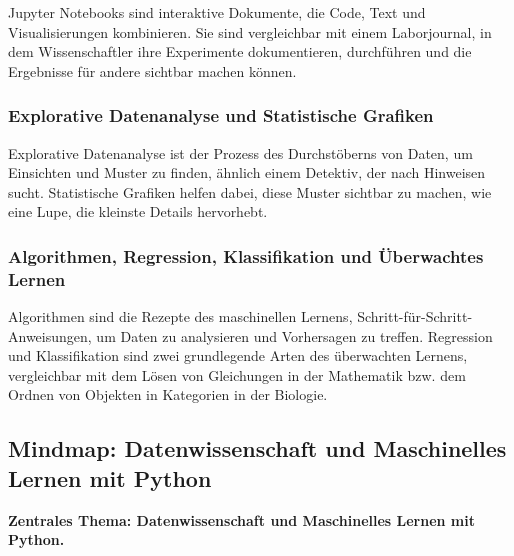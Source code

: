\documentclass{vorlage-design-main}
\begin{document}
Jupyter Notebooks sind interaktive Dokumente, die Code, Text und
Visualisierungen kombinieren. Sie sind vergleichbar mit einem
Laborjournal, in dem Wissenschaftler ihre Experimente dokumentieren,
durchführen und die Ergebnisse für andere sichtbar machen können.

\subsubsection{Explorative Datenanalyse und Statistische
Grafiken}\label{explorative-datenanalyse-und-statistische-grafiken}

Explorative Datenanalyse ist der Prozess des Durchstöberns von Daten, um
Einsichten und Muster zu finden, ähnlich einem Detektiv, der nach
Hinweisen sucht. Statistische Grafiken helfen dabei, diese Muster
sichtbar zu machen, wie eine Lupe, die kleinste Details hervorhebt.

\subsubsection{Algorithmen, Regression, Klassifikation und Überwachtes
Lernen}\label{algorithmen-regression-klassifikation-und-ueberwachtes-lernen}

Algorithmen sind die Rezepte des maschinellen Lernens,
Schritt-für-Schritt-Anweisungen, um Daten zu analysieren und Vorhersagen
zu treffen. Regression und Klassifikation sind zwei grundlegende Arten
des überwachten Lernens, vergleichbar mit dem Lösen von Gleichungen in
der Mathematik bzw. dem Ordnen von Objekten in Kategorien in der
Biologie.

\newpage

\subsection{Mindmap: Datenwissenschaft und Maschinelles Lernen mit
Python}\label{mindmap-datenwissenschaft-und-maschinelles-lernen-mit-python}

\textbf{Zentrales Thema: Datenwissenschaft und Maschinelles Lernen mit
Python.}
\end{document}
